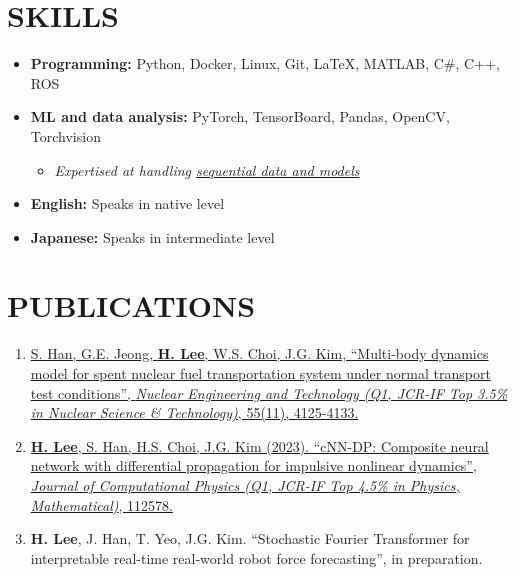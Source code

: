 \documentclass[a4paper,10pt]{extarticle}
\begin{document}
\section*{SKILLS}
\begin{itemize}
    \item \textbf{Programming: }Python, Docker, Linux, Git, \LaTeX, MATLAB, C\#, C++, ROS
    \item \textbf{ML and data analysis:} PyTorch, TensorBoard, Pandas, OpenCV, Torchvision
          \begin{itemize}
              \item \textit{Expertised at handling \underline{sequential data and models}}
          \end{itemize}
    \item \textbf{English: }Speaks in native level
    \item \textbf{Japanese: }Speaks in intermediate level
\end{itemize}


\section*{PUBLICATIONS}
\noindent
\begin{enumerate}[leftmargin=.5cm]
    \item \href{https://www.google.com/url?sa=t&rct=j&q=&esrc=s&source=web&cd=&cad=rja&uact=8&ved=2ahUKEwij36zWpNKCAxXMMEQIHSBfBMUQFnoECBEQAQ&url=https%3A%2F%2Fwww.sciencedirect.com%2Fscience%2Farticle%2Fpii%2FS1738573323003492&usg=AOvVaw1zj_G3k5c77uhMNnmu0EEC&opi=89978449}{S. Han, G.E. Jeong, \textbf{H. Lee}, W.S. Choi, J.G. Kim, “Multi-body dynamics model for spent nuclear fuel transportation system under normal transport test conditions”, \textit{Nuclear Engineering and Technology (Q1, JCR-IF Top 3.5\% in Nuclear Science \& Technology)}, 55(11), 4125-4133.}
    \item \href{https://www.sciencedirect.com/science/article/pii/S0021999123006733?casa_token=ARUkhI8XI8YAAAAA:wTzCIauJvSlonWw-J-SlAFqPX6NZRQS-qBX59l4YN5O3caEppoglU0duVmMkZYf4nWYd7tm_D_E}{\textbf{H. Lee}, S. Han, H.S. Choi, J.G. Kim (2023). “cNN-DP: Composite neural network with differential propagation for impulsive nonlinear dynamics”, \textit{Journal of Computational Physics (Q1, JCR-IF Top 4.5\% in Physics, Mathematical)}, 112578.}
    \item \textbf{H. Lee}, J. Han, T. Yeo, J.G. Kim. “Stochastic Fourier Transformer for interpretable real-time real-world robot force forecasting”, in preparation.
\end{enumerate}
\end{document}

